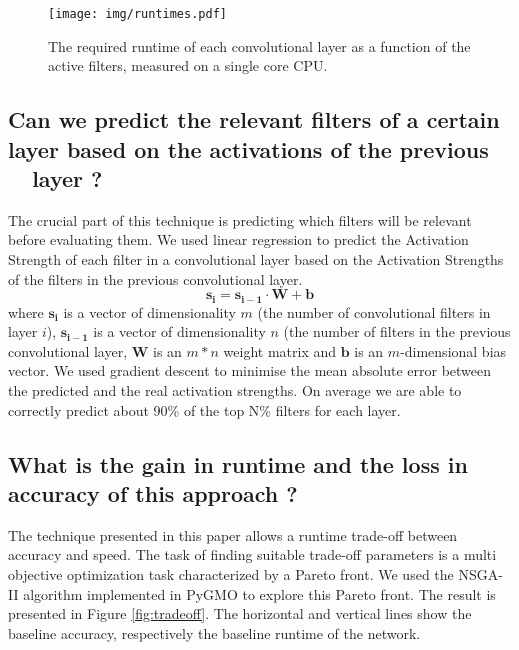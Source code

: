 \documentclass{article}
\begin{document}
\begin{figure}[t]
\begin{center}
\texttt{[image: img/runtimes.pdf]}
\caption{The required runtime of each convolutional layer as a function of the active filters, measured on a single core CPU.}
\label{fig:runtime}
\end{center}
\end{figure}
\subsection{Can we predict the relevant filters of a certain layer based on the activations of the previous \ \ layer ?}
The crucial part of this technique is predicting which filters will be relevant before evaluating them. We used linear regression to predict the Activation Strength of each filter in a convolutional layer based on the Activation Strengths of the filters in the previous convolutional layer.
\\\[\mathbf{s_i} = \mathbf{s_{i-1}} \cdot \mathbf{W} + \mathbf{b}\] where $\mathbf{s_i}$ is a vector of dimensionality $m$ (the number of convolutional filters in layer $i$), $\mathbf{s_{i-1}}$ is a vector of dimensionality $n$ (the number of filters in the previous convolutional layer, $\mathbf{W}$ is an $m*n$ weight matrix and $\mathbf{b}$ is an $m$-dimensional bias vector. We used gradient descent to minimise the mean absolute error between the predicted and the real activation strengths. On average we are able to correctly predict about 90\% of the top N\% filters for each layer.


\subsection{What is the gain in runtime and the loss in accuracy of this approach ?}
The technique presented in this paper allows a runtime trade-off between accuracy and speed. The task of finding suitable trade-off parameters is a multi objective optimization task characterized by a Pareto front. We used the NSGA-II algorithm \cite{deb2002fast} implemented in PyGMO \cite{izzo2012pygmo} to explore this Pareto front. The result is presented in Figure \ref{fig:tradeoff}. The horizontal and vertical lines show the baseline accuracy, respectively the baseline runtime of the network.
\end{document}
